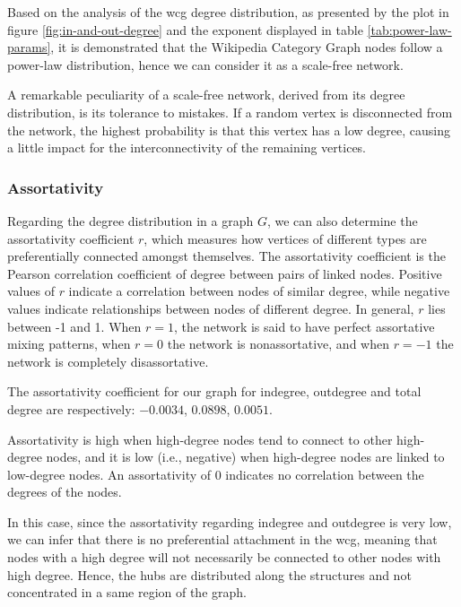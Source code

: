 Based on the analysis of the \gls{wcg} degree distribution, as presented by the plot in figure \ref{fig:in-and-out-degree} and the exponent displayed in table \ref{tab:power-law-params}, it is demonstrated that the Wikipedia Category Graph nodes follow a power-law distribution, hence we can consider it as a scale-free network.  

A remarkable peculiarity of a scale-free network, derived from its degree distribution, is its tolerance to mistakes. If a random vertex is disconnected from the network, the highest probability is that this vertex has a low degree, causing a little impact for the interconnectivity of the remaining vertices.

\subsubsection{\hspace*{3pt} Assortativity}

Regarding the degree distribution in a graph $G$, we can also determine the assortativity coefficient $r$, which measures how vertices of different types are preferentially connected amongst themselves. The assortativity coefficient \cite{newman2003mixing} is the Pearson correlation coefficient of degree between pairs of linked nodes. Positive values of $r$ indicate a correlation between nodes of similar degree, while negative values indicate relationships between nodes of different degree. In general, $r$ lies between -1 and 1. When $r = 1$, the network is said to have perfect assortative mixing patterns, when $r = 0$ the network is non\-assortative, and when  $r=-1$ the network is completely disassortative.

The assortativity coefficient for our graph for indegree, outdegree and total degree are  respectively: 
$-0.0034$, $0.0898$, $0.0051$. 

Assortativity is high when high-degree nodes tend to connect to other high-degree nodes, and it is low (i.e., negative) when high-degree nodes are linked to low-degree nodes. An assortativity of 0 indicates no correlation between the degrees of the nodes.

In this case, since the assortativity regarding indegree and outdegree is very low, we can infer that there is no preferential attachment in the \gls{wcg}, meaning that nodes with a high degree will not necessarily be connected to other nodes with high degree.  Hence, the hubs are distributed along the structures and not concentrated in a same region of the graph.



